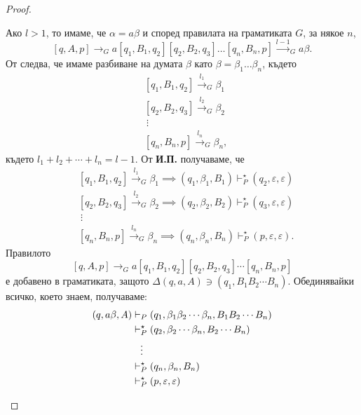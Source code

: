\begin{proof}
\begin{description}
    Ако $l > 1$, то имаме, че $\alpha = a\beta$ и според правилата на граматиката $G$, за някое $n$, 
    \[[q,A,p] \rightarrow_G a[q_1,B_1,q_2][q_2,B_2,q_3]\dots[q_n,B_n,p] \stackrel{l-1}{\to}_G a\beta.\]
    От  следва, че имаме разбиване на думата $\beta$ като $\beta = \beta_1\dots \beta_n$, където 
    \begin{align*}
      & [q_1,B_1,q_{2}] \stackrel{l_1}{\to}_G \beta_1\\
      & [q_2,B_2,q_{3}] \stackrel{l_2}{\to}_G \beta_2\\
      & \ \vdots\\
      & [q_{n},B_n, p] \stackrel{l_n}{\to}_G \beta_n,
    \end{align*}
    където $l_1 + l_2 + \cdots + l_n = l-1$.
    От {\bf И.П.} получаваме, че 
    \begin{align*}
      & [q_1,B_1,q_{2}] \stackrel{l_1}{\to}_G \beta_1 \implies (q_1,\beta_1,B_1) \vdash^\star_P (q_{2},\varepsilon,\varepsilon) \\
      & [q_2,B_2,q_{3}] \stackrel{l_2}{\to}_G \beta_2 \implies (q_2,\beta_2,B_2) \vdash^\star_P (q_{3},\varepsilon,\varepsilon)\\
      & \ \vdots\\
      & [q_{n},B_n, p] \stackrel{l_n}{\to}_G \beta_n \implies  (q_{n},\beta_n,B_n) \vdash^\star_P (p,\varepsilon,\varepsilon).
    \end{align*}
    Правилото
    \[[q,A,p] \rightarrow_G a[q_1,B_1,q_2][q_2,B_2,q_3]\cdots[q_n,B_n,p]\]
    е добавено в граматиката, защото $\Delta(q,a,A) \ni (q_1, B_1B_2\cdots B_n)$. 
    Обединявайки всичко, което знаем, получаваме:
    \begin{align*}
      (q, a\beta, A) & \vdash_P (q_1, \beta_1\beta_2\cdots\beta_n, B_1B_2\cdots B_n)\\
                     & \vdash^\star_P (q_2, \beta_{2}\cdots\beta_n, B_2\cdots B_n)\\
                     & \hspace{0.3cm} \vdots\\
                     & \vdash^\star_P (q_n, \beta_n, B_n)\\
                     & \vdash^\star_P (p, \varepsilon, \varepsilon)
    \end{align*}
  \end{description}
\end{proof}
  
